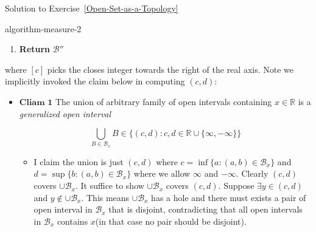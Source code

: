 \begin{mystsolution}{Solution to Exercise~\ref{Open-Set-as-a-Topology}}
\begin{mystthmalgorithm}{}{algorithm-measure-2}
\begin{enumerate}
\begin{enumerate}
\item Compute $(c,d)=\bigcup_{B\in \mathcal B_x} B$ where $c,d$ is in extended real number system.
\item \textbf{If} $c,d\in \mathbb{R}$:

\begin{enumerate}
\item $\mathcal{B}_x'=\{(c,d)\}$
\end{enumerate}


\item \textbf{Else if} $c\in \mathbb{R}, d=\infty$:

\begin{enumerate}
\item $\mathcal{B}_x'\gets \{(c,[c])\}\cup \{[c],[c]+j\}_{j=1}^{\infty}$
\end{enumerate}


\item \textbf{Else}
Other cases follows as (3)
\item $\mathcal B'' = \mathcal B'' \cup \mathcal B_x '$
\end{enumerate}


\item \textbf{Return} $\mathcal B''$
\end{enumerate}

\end{mystthmalgorithm}
where $[c]$ picks the closes integer towards the right of the real axis.
Note we implicitly invoked the claim below in computing $(c,d)$:

\begin{itemize}
\item $\boxed{\textbf{Cliam 1}}$ The union of arbitrary family of open intervals containing $x\in \mathbb{R}$ is a \textit{generalized open interval}

\begin{equation}
\bigcup_{B\in \mathcal B_x} B\in \{(c,d): c,d\in \mathbb{R}\cup \{\infty, -\infty\}\}
\end{equation}

\begin{itemize}
\item I claim the union is just $(c,d)$ where $c=\inf \{a:(a,b)\in \mathcal B_x\}$ and $d=\sup \{b:(a,b)\in \mathcal B_x\}$ where we allow $\infty$ and $-\infty$. Clearly $(c,d)$ covers $\cup \mathcal B_x$. It suffice to show $\cup \mathcal B_x$ covers $(c,d)$. Suppose $\exists y \in (c,d)$ and $y\notin \cup \mathcal B_x$. This means $\cup \mathcal B_x$ has a hole and there must exists a pair of open interval in $\mathcal B_x$ that is disjoint, contradicting that all open intervals in $\mathcal B_x$ contains $x$(in that case no pair should be disjoint).
\end{itemize}
\end{itemize}


\end{mystsolution}
